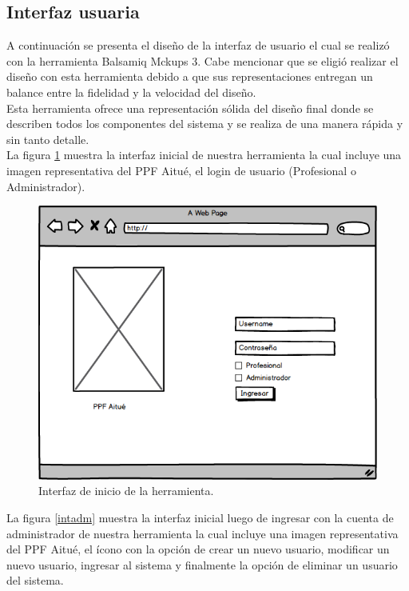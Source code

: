 \subsection{Interfaz usuaria}

A continuación se presenta el diseño de la interfaz de usuario el cual se realizó con la herramienta Balsamiq Mckups 3. Cabe mencionar que se eligió realizar el diseño con esta herramienta debido a que sus representaciones entregan un balance entre la fidelidad y la velocidad del diseño. \\
Esta herramienta ofrece una representación sólida del diseño final donde se describen todos los componentes del sistema y se realiza de una manera rápida y sin tanto detalle. \\

La figura \ref{intinicio} muestra la interfaz inicial de nuestra herramienta la cual incluye una imagen representativa del PPF Aitué, el login de usuario (Profesional o Administrador).\\

\begin{figure}[h]
	\label{intinicio}
	\begin{center}
		\includegraphics[scale=0.5]{imagenes/login.png}
	\end{center}
	\caption{Interfaz de inicio de la herramienta.}
\end{figure}

\clearpage
\newpage

La figura \ref{intadm} muestra la interfaz inicial luego de ingresar con la cuenta de administrador de nuestra herramienta la cual incluye una imagen representativa del PPF Aitué, el ícono con la opción de crear un nuevo usuario, modificar un nuevo usuario, ingresar al sistema y finalmente la opción de eliminar un usuario del sistema.\\


